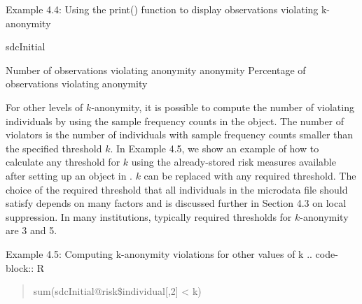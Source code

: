 \documentclass[letterpaper,10pt,english]{sphinxmanual}
\begin{document}
Example 4.4: Using the print() function to display observations
violating k-anonymity

%
\begin{sphinxVerbatim}[commandchars=\\\{\}]
sdcInitial 

Number of observations violating
  anonymity 
  anonymity 
Percentage of observations violating
  anonymity  
\end{sphinxVerbatim}

For other levels of \(k\)-anonymity, it is possible to compute the
number of violating individuals by using the sample frequency counts in
the  object. The number of violators is the number of
individuals with sample frequency counts smaller than the specified
threshold \(k\). In Example 4.5, we show an example of how to
calculate any threshold for \(k\) using the already-stored risk
measures available after setting up an  object in .
\(k\) can be replaced with any required threshold. The choice of the
required threshold that all individuals in the microdata file should
satisfy depends on many factors and is discussed further in Section 4.3
on local suppression. In many institutions, typically required
thresholds for \(k\)-anonymity are 3 and 5.

Example 4.5: Computing k-anonymity violations for other values of k
.. code-block:: R
\begin{quote}

sum(sdcInitial@risk\$individual{[},2{]} \textless{} k)
\end{quote}
\end{document}
